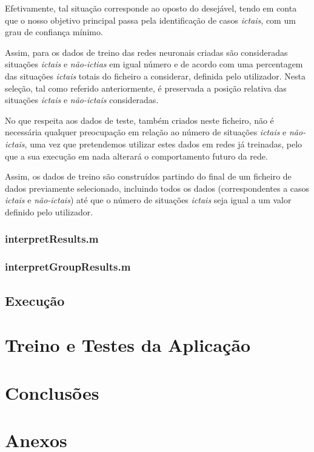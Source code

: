 \documentclass{article}
\begin{document}
Efetivamente, tal situação corresponde ao oposto do desejável, tendo em conta que o nosso objetivo principal passa pela identificação de casos \emph{ictais}, com um grau de confiança mínimo.

Assim, para os dados de treino das redes neuronais criadas são consideradas situações \emph{ictais} e \emph{não-ictias} em igual número e de acordo com uma percentagem das situações \emph{ictais} totais do ficheiro a considerar, definida pelo utilizador. Nesta seleção, tal como referido anteriormente, é preservada a posição relativa das situações \emph{ictais} e \emph{não-ictais} consideradas.

No que respeita aos dados de teste, também criados neste ficheiro, não é necessária qualquer preocupação em relação ao número de situações \emph{ictais} e \emph{não-ictais}, uma vez que pretendemos utilizar estes dados em redes já treinadas, pelo que a sua execução em nada alterará o comportamento futuro da rede.

Assim, os dados de treino são construídos partindo do final de um ficheiro de dados previamente selecionado, incluindo todos os dados (correspondentes a casos \emph{ictais} e \emph{não-ictais}) até que o número de situações \emph{ictais} seja igual a um valor definido pelo utilizador.

\subsubsection{interpretResults.m}



\subsubsection{interpretGroupResults.m}

\subsection{Execução}


\pagebreak

\section{Treino e Testes da Aplicação}



\pagebreak

\section{Conclusões}


\pagebreak

\section{Anexos}
\end{document}

